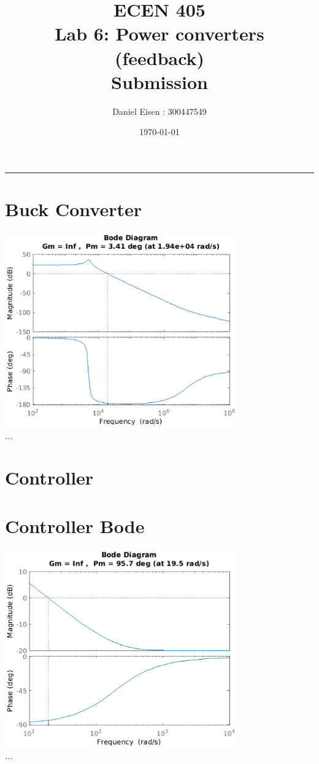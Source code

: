 \documentclass[11pt]{article}
\title{ECEN 405 \\ Lab 6: Power converters \\ (feedback) \\ Submission}
\author{Daniel Eisen : 300447549}
\date{\today}
\begin{document}
\begin{preview}

    \maketitle
    \hrule
    \section{Buck Converter}
    \begin{center}
        \includegraphics[width=0.75\textwidth]{img/buck.eps}\\
        \textit{...}
    \end{center}
    
    \section{Controller}
    
    \section{Controller Bode}
    \begin{center}
        \includegraphics[width=0.75\textwidth]{img/controller.eps}\\
        \textit{...}
    \end{center}
    

\end{preview}
\end{document}
